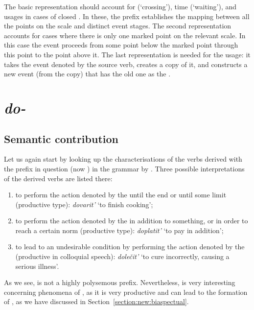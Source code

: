 The basic representation should account for  (`crossing'), time (`waiting'), and  usages in cases of closed . In these, the prefix establishes the mapping between all the points on the scale and distinct event stages. The second representation accounts for cases where there is only one marked point on the relevant scale. In this case the event proceeds from some point below the marked point through this point to the point above it. The last representation is needed for the  usage: it takes the event denoted by the source verb, creates a copy of it, and constructs a new event (from the copy) that has the old one as the .

\section{\textit{do-}}\label{subsection:semantics:do}
\subsection{Semantic contribution}
Let us again start by looking up the characterisations of the verbs derived with the prefix in question (now ) in the grammar by \citet[357--358]{Shvedova:82}. Three possible interpretations of the derived verbs are listed there:
\begin{enumerate}
\item to perform the action denoted by the  until the end or until some limit (productive type): \textit{dovarit'} `to finish cooking';
\item to perform the action denoted by the  in addition to something, or in order to reach a certain norm (productive type): \textit{doplatit'} `to pay in addition';
\item to lead to an undesirable condition by performing the action denoted by the  (productive in colloquial speech): \textit{dole\v{c}it'} `to cure incorrectly, causing a serious illness'.
\end{enumerate}

As we see,  is not a highly polysemous prefix. Nevertheless,  is very interesting concerning phenomena of , as it is very productive and can lead to the formation of , as we have discussed in Section~\ref{section:new:biaspectual}. 

